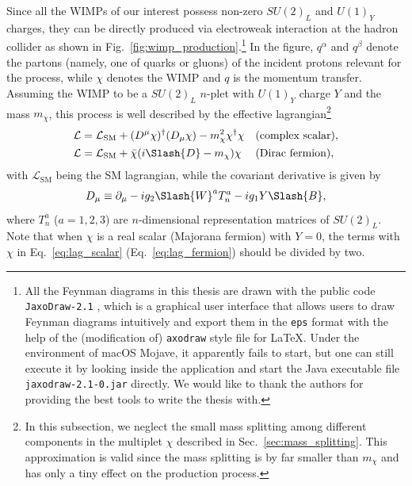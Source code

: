 \documentclass[12pt,twoside,book]{article}
\begin{document}
Since all the WIMPs of our interest possess non-zero $SU(2)_L$ and $U(1)_Y$ charges, they can be directly produced via electroweak interaction at the hadron collider as shown in Fig.~\ref{fig:wimp_production}.\footnote
{
  All the Feynman diagrams in this thesis are drawn with the public code \texttt{JaxoDraw-2.1} \cite{BINOSI20091709}, which is a graphical user interface that allows users to draw Feynman diagrams intuitively and export them in the \texttt{eps} format with the help of the (modification of) \texttt{axodraw} style file for \LaTeX \cite{VERMASEREN199445}.
  Under the environment of macOS Mojave, it apparently fails to start, but one can still execute it by looking inside the application and start the Java executable file \texttt{jaxodraw-2.1-0.jar} directly.
  We would like to thank the authors for providing the best tools to write the thesis with.
}
In the figure, $q^\alpha$ and $q^\beta$ denote the partons (namely, one of quarks or gluons) of the incident protons relevant for the process, while $\chi$ denotes the WIMP and $q$ is the momentum transfer.
Assuming the WIMP to be a $SU(2)_L$ $n$-plet with $U(1)_Y$ charge $Y$ and the mass $m_\chi$, this process is well described by the effective lagrangian\footnote
{
  In this subsection, we neglect the small mass splitting among different components in the multiplet $\chi$ described in Sec.~\ref{sec:mass_splitting}.
  This approximation is valid since the mass splitting is by far smaller than $m_\chi$ and has only a tiny effect on the production process.
}
\begin{align}
  \mathcal{L} &= \mathcal{L}_{\mathrm{SM}} + (D^\mu \chi)^\dagger (D_\mu \chi) - m_\chi^2 \chi^\dagger \chi &
  &\text{(complex scalar)}, \label{eq:lag_scalar}\\
  \mathcal{L} &= \mathcal{L}_{\mathrm{SM}} + \bar{\chi} (i \Slash{D} - m_\chi) \chi &
  &\text{(Dirac fermion)}, \label{eq:lag_fermion}
\end{align}
with $\mathcal{L}_{\mathrm{SM}}$ being the SM lagrangian, while the covariant derivative is given by
\begin{align}
  D_\mu \equiv \partial_\mu - i g_2 \Slash{W}^a T_n^a - i g_1 Y \Slash{B},
\end{align}
where $T_n^a$ ($a=1,2,3$) are $n$-dimensional representation matrices of $SU(2)_L$.
Note that when $\chi$ is a real scalar (Majorana fermion) with $Y=0$, the terms with $\chi$ in Eq.~\eqref{eq:lag_scalar} (Eq.~\eqref{eq:lag_fermion}) should be divided by two.
\end{document}
